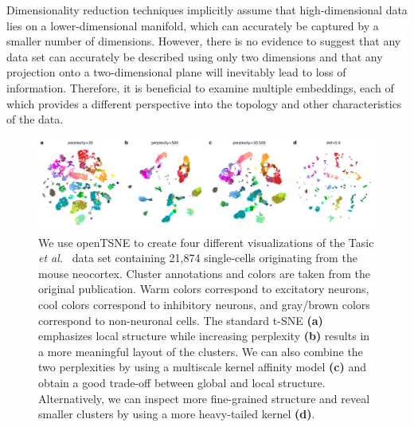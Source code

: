 \documentclass[twocolumn]{bmcart}
\begin{document}
Dimensionality reduction techniques implicitly assume that high-dimensional data lies on a lower-dimensional manifold, which can accurately be captured by a smaller number of dimensions. However, there is no evidence to suggest that any data set can accurately be described using only two dimensions and that any projection onto a two-dimensional plane will inevitably lead to loss of information. Therefore, it is beneficial to examine multiple embeddings, each of which provides a different perspective into the topology and other characteristics of the data.
\begin{figure}[htbp]
  \includegraphics[width=\textwidth]{tasic2018}
  \caption{\label{fig:tasic}We use openTSNE to create four different visualizations of the Tasic \textit{et al.}~\cite{tasic2018shared} data set containing 21,874 single-cells originating from the mouse neocortex. Cluster annotations and colors are taken from the original publication. Warm colors correspond to excitatory neurons, cool colors correspond to inhibitory neurons, and gray/brown colors correspond to non-neuronal cells. The standard t-SNE \textbf{(a)} emphasizes local structure while increasing perplexity \textbf{(b)} results in a more meaningful layout of the clusters. We can also combine the two perplexities by using a multiscale kernel affinity model \textbf{(c)} and obtain a good trade-off between global and local structure. Alternatively, we can inspect more fine-grained structure and reveal smaller clusters by using a more heavy-tailed kernel \textbf{(d)}.}
\end{figure}
\end{document}
